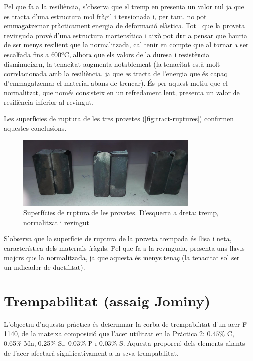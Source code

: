 \documentclass[a4paper]{report}
\begin{document}
Pel que fa a la resiliència, s’observa que el tremp en presenta un valor nul ja que es tracta d’una estructura mol fràgil i tensionada i, per tant, no pot emmagatzemar pràcticament energia de deformació elàstica. Tot i que la proveta revinguda prové d’una estructura martensítica i això pot dur a pensar que hauria de ser menys resilient que la normalitzada, cal tenir en compte que al tornar a ser escalfada fins a 600ºC, alhora que els valors de la duresa i resistència disminueixen, la tenacitat augmenta notablement (la tenacitat està molt correlacionada amb la resiliència, ja que es tracta de l’energia que és capaç d’emmagatzemar el material abans de trencar). És per aquest motiu que el normalitzat, que només consisteix en un refredament lent, presenta un valor de resiliència inferior al revingut.

Les superfícies de ruptura de les tres provetes (\autoref{fig:tract-ruptures}) confirmen aquestes conclusions.

\begin{figure}[H]
	\centering
	\includegraphics[width=0.8\textwidth]{images/tractaments/ruptures}
	\caption{Superfícies de ruptura de les provetes. D'esquerra a dreta: tremp, normalitzat i revingut}
	\label{fig:tract-ruptures}
\end{figure}

S’observa que la superfície de ruptura de la proveta trempada és llisa i neta, característica dels materials fràgils. Pel que fa a la revinguda, presenta uns llavis majors que la normalitzada, ja que aquesta és menys tenaç (la tenacitat sol ser un indicador de ductilitat).

\chapter{Trempabilitat (assaig Jominy)}
L’objectiu d’aquesta pràctica és determinar la corba de trempabilitat d’un acer F-1140, de la mateixa composició que l’acer utilitzat en la Pràctica 2: 0.45\% C, 0.65\% Mn, 0.25\% Si, 0.03\% P i 0.03\% S. Aquesta proporció dels elements aliants de l’acer afectarà significativament a la seva trempabilitat.
\end{document}
